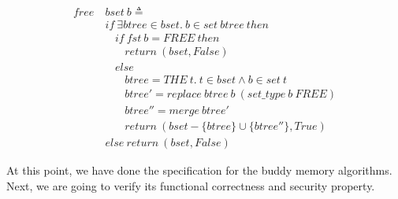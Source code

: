 \begin{definition} 
\end{definition}
\vspace{-7pt}
{\footnotesize
\begin{align*}
free\ &bset\ b \triangleq \\
&if\ \exists btree \in bset.\ b \in set\ btree\ then \\
&\ \ \ \ if\ fst\ b = FREE\ then \\
&\ \ \ \ \ \ \ \ return\ (bset, False) \\
&\ \ \ \ else \\
&\ \ \ \ \ \ \ \ btree = THE\ t.\ t \in bset \wedge b \in set\ t \\
&\ \ \ \ \ \ \ \ btree' = replace\ btree\ b\ (set\_type\ b\ FREE) \\
&\ \ \ \ \ \ \ \ btree'' = merge\ btree' \\
&\ \ \ \ \ \ \ \ return\ (bset - \lbrace btree \rbrace \cup \lbrace btree'' \rbrace, True) \\
&else\ return\ (bset, False)
\end{align*}
}
\vspace{-12pt}

At this point, we have done the specification for the buddy memory algorithms. Next, we are going to verify its functional correctness and security property.